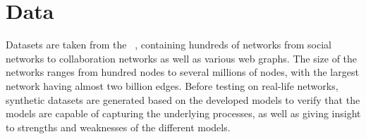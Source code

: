 \chapter{Data}\label{ch:Data}

Datasets are taken from the ~\cite{snapnets}, containing hundreds of networks from social networks to collaboration networks as well as various web graphs. The size of the networks ranges from hundred nodes to several millions of nodes, with the largest network having almost two billion edges.
Before testing on real-life networks, synthetic datasets are generated based on the developed models to verify that the models are capable of capturing the underlying processes, as well as giving insight to strengths and weaknesses of the different models. 


% 

